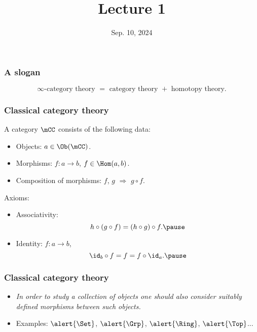 


\title{Lecture 1}

\date{Sep. 10, 2024}




\frame{\titlepage}

\begin{frame}
	\frametitle{A slogan}

	\[
		\infty\mbox{-category theory }=\mbox{ category theory }+\mbox{ homotopy theory}.
	\]
	
\end{frame}

\begin{frame}
	\frametitle{Classical category theory}

	
\begin{defn}
	A \alert{category} $\mCC$ consists of the following data:\pause
	\begin{itemize}
		\item 
			\alert{Objects}: $a\in \Ob(\mCC)$. \pause
		\item
			\alert{Morphisms}: $f:a\to b$, $f\in \Hom(a,b)$. \pause
		\item
			\alert{Composition of morphisms}: $f$, $g$ $\Rightarrow$ $g\circ f$. \pause
			
	\end{itemize}
	Axioms:
	\begin{itemize}
		\item 
			\alert{Associativity}: 
			\[
				h\circ (g\circ f) = (h\circ g) \circ f. \pause
			\] 
		\item
			\alert{Identity}: $f:a\to b$, 
			\[
				\id_b\circ f = f = f\circ \id_a. \pause
			\]
	\end{itemize}
\end{defn}

	
	
\end{frame}

\begin{frame}
	\frametitle{Classical category theory}

	\begin{itemize}
		\item
			\emph{In order to study a collection of objects one should also consider suitably defined morphisms between such objects.}\pause
		\item
			Examples: $\alert{\Set}$, $\alert{\Grp}$, $\alert{\Ring}$, $\alert{\Top}$... 
	\end{itemize}
	


	
	
\end{frame}

